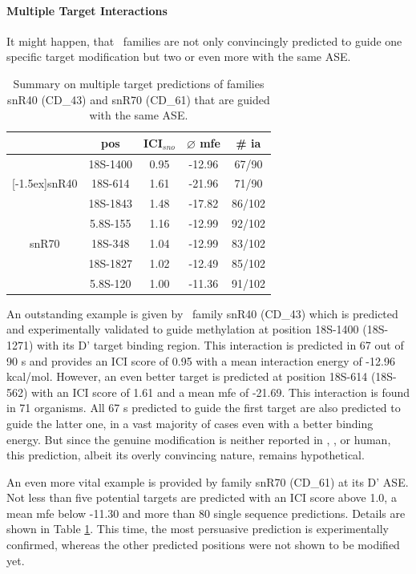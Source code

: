\paragraph{\textbf{Multiple Target Interactions}}
It might happen, that \sno\ families are not only convincingly
predicted to guide one specific target modification but two or even
more with the same ASE.
\begin{table}
  \caption{Summary on
    multiple target predictions of families snR40 (CD\_43) and snR70 (CD\_61) that are guided with the same ASE.}
  \label{tab:redundant_predictions}
  \begin{center}
    \begin{footnotesize}
      \begin{tabular}{c|c|c|c|c}
        &pos&ICI$_{sno}$&$\varnothing$
          mfe&\# ia\\
        \hline
        &18S-1400&0.95&-12.96&67/90\\
        \raisebox{1.5ex}[-1.5ex]{snR40}&18S-614&1.61&-21.96&71/90\\
        \hline
        &18S-1843&1.48&-17.82&86/102\\
        &5.8S-155&1.16&-12.99&92/102\\
        snR70&18S-348&1.04&-12.99&83/102\\
        &18S-1827&1.02&-12.49&85/102\\
        &5.8S-120&1.00&-11.36&91/102\\
      \end{tabular}
    \end{footnotesize}
  \end{center}
\end{table}
An outstanding example is given by \cd\ family
snR40 (CD\_43) which is predicted and experimentally validated to guide
methylation at position 18S-1400 (18S-1271) with its D' target binding
region. This interaction is predicted in 67 out of 90 \sno s and provides
an ICI score of 0.95 with a mean interaction energy of -12.96
kcal/mol. However, an even better target is predicted at position
18S-614 (18S-562) with an ICI score of 1.61 and a mean mfe of
-21.69. This interaction is found in 71 organisms. All 67 \sno s
predicted to guide the first target are also predicted to guide the
latter one, in a vast majority of cases even with a better binding
energy. But since the genuine modification is neither reported in
\sce, \ncr, or human, this prediction, albeit its overly convincing
nature, remains hypothetical. 

An even more vital example is provided by family snR70 (CD\_61) at its D' ASE.
Not less than five potential targets are predicted with an ICI score
above 1.0, a mean mfe below -11.30 and more than 80 single sequence
predictions. Details are shown in Table
\ref{tab:redundant_predictions}. This time, the most persuasive
prediction is experimentally confirmed, whereas the other predicted
positions were not shown to be modified yet. 
